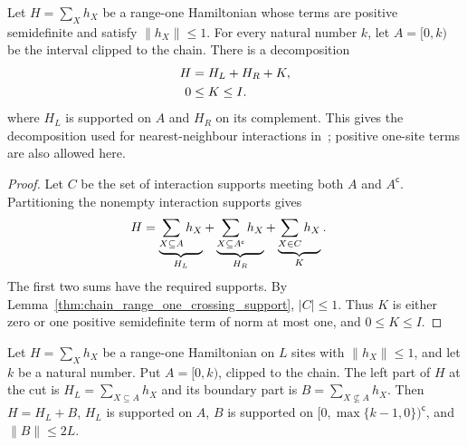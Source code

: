 \begin{lemma}
    \label{thm:chain_range_one_cut_decomposition}
    \leanok
    Let $H=\sum_Xh_X$ be a range-one Hamiltonian whose terms are positive
    semidefinite and satisfy $\|h_X\|\le1$. For every natural number $k$,
    let $A=\lbrack0,k)$ be the interval clipped to the chain. There is a
    decomposition
    \begin{align}
        H & =H_L+H_R+K,\notag \\
        0 & \le K\le I.\notag
    \end{align}
    where $H_L$ is supported on $A$ and $H_R$ on its complement.
    This gives the decomposition used for nearest-neighbour interactions
    in~\cite[lines 283 and 409--410]{Landau2015Polynomial}; positive
    one-site terms are also allowed here.
\end{lemma}
\begin{proof}\leanok
    Let $C$ be the set of interaction supports meeting both $A$ and $A^{\mathsf c}$.
    Partitioning the nonempty interaction supports gives
    \begin{align}
        H & =\underbrace{\sum_{X\subseteq A}h_X}_{H_L}
        +\underbrace{\sum_{X\subseteq A^{\mathsf c}}h_X}_{H_R}
        +\underbrace{\sum_{X\in C}h_X}_{K}.\notag
    \end{align}
    The first two sums have the required supports. By
    Lemma~\ref{thm:chain_range_one_crossing_support}, $|C|\le1$.
    Thus $K$ is either zero or one positive semidefinite term of norm at
    most one, and $0\le K\le I$.
\end{proof}

\begin{definition}
    \label{def:chain_gluing_hamiltonian_parts}
    \leanok
    Let $H=\sum_Xh_X$ be a range-one Hamiltonian on $L$ sites with
    $\lVert h_X\rVert\le1$, and let $k$ be a natural number. Put
    $A=\lbrack0,k)$, clipped to the chain. The left part of $H$ at the cut is
    $H_L=\sum_{X\subseteq A}h_X$ and its boundary part is
    $B=\sum_{X\nsubseteq A}h_X$. Then $H=H_L+B$, $H_L$ is supported on $A$,
    $B$ is supported on $\lbrack0,\max\{k-1,0\})^{\mathsf c}$, and
    $\lVert B\rVert\le2L$.
\end{definition}

